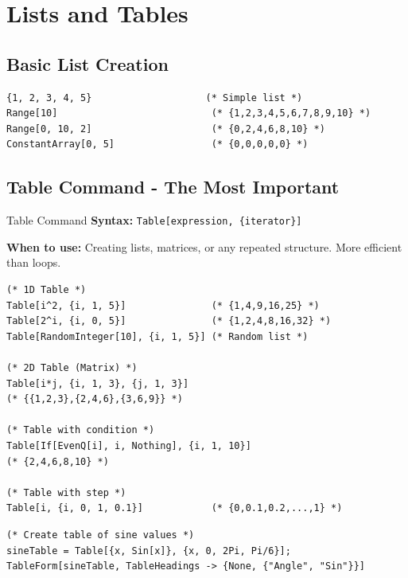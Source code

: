 \documentclass[12pt,a4paper]{article}
\begin{document}
\tableofcontents
\newpage

\section{Lists and Tables}

\subsection{Basic List Creation}

\begin{commandbox}
\begin{lstlisting}
{1, 2, 3, 4, 5}                    (* Simple list *)
Range[10]                           (* {1,2,3,4,5,6,7,8,9,10} *)
Range[0, 10, 2]                     (* {0,2,4,6,8,10} *)
ConstantArray[0, 5]                 (* {0,0,0,0,0} *)
\end{lstlisting}
\end{commandbox}

\subsection{Table Command - The Most Important}

\begin{mainbox}{Table Command}
\textbf{Syntax:} \texttt{Table[expression, \{iterator\}]}

\textbf{When to use:} Creating lists, matrices, or any repeated structure. More efficient than loops.

\begin{lstlisting}
(* 1D Table *)
Table[i^2, {i, 1, 5}]               (* {1,4,9,16,25} *)
Table[2^i, {i, 0, 5}]               (* {1,2,4,8,16,32} *)
Table[RandomInteger[10], {i, 1, 5}] (* Random list *)

(* 2D Table (Matrix) *)
Table[i*j, {i, 1, 3}, {j, 1, 3}]    
(* {{1,2,3},{2,4,6},{3,6,9}} *)

(* Table with condition *)
Table[If[EvenQ[i], i, Nothing], {i, 1, 10}]
(* {2,4,6,8,10} *)

(* Table with step *)
Table[i, {i, 0, 1, 0.1}]            (* {0,0.1,0.2,...,1} *)
\end{lstlisting}
\end{mainbox}

\begin{examplebox}
\begin{lstlisting}
(* Create table of sine values *)
sineTable = Table[{x, Sin[x]}, {x, 0, 2Pi, Pi/6}];
TableForm[sineTable, TableHeadings -> {None, {"Angle", "Sin"}}]
\end{lstlisting}
\end{examplebox}
\end{document}
